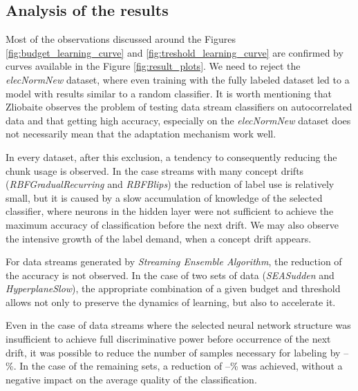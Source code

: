 

\subsection{Analysis of the results}
\label{subsec:exp:analysis}

\noindent Most of the observations discussed around the Figures \ref{fig:budget_learning_curve} and \ref{fig:treshold_learning_curve} are confirmed by curves available in the Figure \ref{fig:result_plots}. We need to reject the \emph{elecNormNew} dataset, where even training with the fully labeled dataset led to a model with results similar to a random classifier.
It is worth mentioning that Zliobaite \cite{Zliobaite:2013} observes the problem of testing data stream classifiers on autocorrelated data and that getting high accuracy, especially on the \emph{elecNormNew} dataset does not necessarily mean that the adaptation mechanism work well. 

In every dataset, after this exclusion, a tendency to consequently reducing the chunk usage is observed. In the case streams with many concept drifts (\emph{RBFGradualRecurring} and \emph{RBFBlips}) the reduction of label use is relatively small, but it is caused by a slow accumulation of knowledge of the selected classifier, where  neurons in the hidden layer were not sufficient to achieve the maximum accuracy of classification before the next drift. We may also observe the intensive growth of the label demand, when a concept drift appears.

For data streams generated by \emph{Streaming Ensemble Algorithm}, the reduction of the accuracy is not observed. In the case of two sets of data (\emph{SEASudden} and \emph{HyperplaneSlow}), the appropriate combination of a given budget and threshold allows not only to preserve the dynamics of learning, but also to accelerate it.

Even in the case of data streams where the selected neural network structure was insufficient to achieve full discriminative power before occurrence of the next drift, it was possible to reduce the number of samples necessary for labeling by --\%. In the case of the remaining sets, a reduction of --\% was achieved, without a negative impact on the average quality of the classification.


